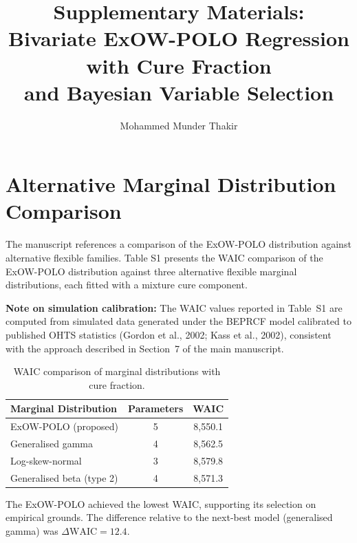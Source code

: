 \documentclass[12pt,a4paper]{article}
\begin{document}
\title{Supplementary Materials:\\ Bivariate ExOW-POLO Regression with Cure Fraction \\ and Bayesian Variable Selection}
\author{Mohammed Munder Thakir}
\date{}
\maketitle

\tableofcontents
\newpage

\section{Alternative Marginal Distribution Comparison}

The manuscript references a comparison of the ExOW-POLO distribution against alternative flexible families. Table S1 presents the WAIC comparison of the ExOW-POLO distribution against three alternative flexible marginal distributions, each fitted with a mixture cure component.

\textbf{Note on simulation calibration:} The WAIC values reported in Table~S1 are computed from simulated data generated under the BEPRCF model calibrated to published OHTS statistics (Gordon et al., 2002; Kass et al., 2002), consistent with the approach described in Section~7 of the main manuscript.

\begin{table}[H]
\centering
\caption{WAIC comparison of marginal distributions with cure fraction.}
\label{tab:S1}
\begin{tabular}{lcc}
\toprule
\textbf{Marginal Distribution} & \textbf{Parameters} & \textbf{WAIC} \\
\midrule
ExOW-POLO (proposed) & 5 & 8{,}550.1 \\
Generalised gamma & 4 & 8{,}562.5 \\
Log-skew-normal & 3 & 8{,}579.8 \\
Generalised beta (type 2) & 4 & 8{,}571.3 \\
\bottomrule
\end{tabular}
\end{table}

The ExOW-POLO achieved the lowest WAIC, supporting its selection on empirical grounds. The difference relative to the next-best model (generalised gamma) was $\Delta\text{WAIC} = 12.4$.
\end{document}
